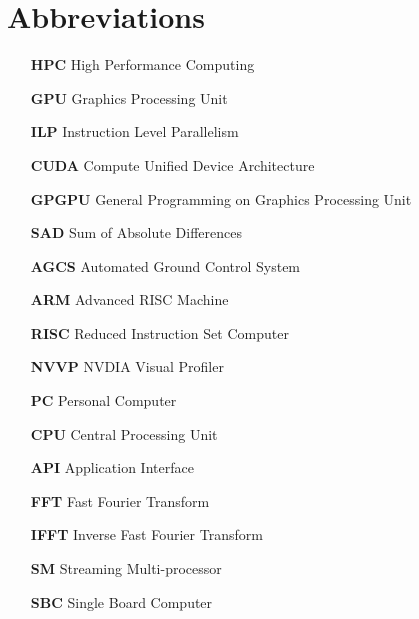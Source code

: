 \chapter*{Abbreviations}
\begin{itemize}
\item [\textbf{HPC}] \hspace{0.5cm} High Performance Computing
\item[\textbf{GPU}]	\hspace{0.5cm}	Graphics Processing Unit
\item[\textbf{ILP}]	\hspace{0.5cm}	Instruction Level Parallelism
\item[\textbf{CUDA}]\hspace{0.5cm}	Compute Unified Device Architecture
\item[\textbf{GPGPU}]\hspace{0.5cm}	General Programming on Graphics Processing Unit
\item[\textbf{SAD}]	\hspace{0.5cm}	Sum of Absolute Differences
\item[\textbf{AGCS}]\hspace{0.5cm}	Automated Ground Control System
\item[\textbf{ARM}] \hspace{0.5cm}	Advanced RISC Machine
\item[\textbf{RISC}] \hspace{0.5cm}	Reduced Instruction Set Computer
\item[\textbf{NVVP}] \hspace{0.5cm}	NVDIA Visual Profiler 
\item[\textbf{PC}]	\hspace{0.5cm}	Personal Computer
\item[\textbf{CPU}]	\hspace{0.5cm}	Central Processing Unit
\item[\textbf{API}]	\hspace{0.5cm}	Application Interface
\item[\textbf{FFT}] \hspace{0.5cm}	Fast Fourier Transform
\item[\textbf{IFFT}] \hspace{0.5cm} 	Inverse Fast Fourier Transform
\item[\textbf{SM}] 	\hspace{0.5cm}	Streaming Multi-processor
\item[\textbf{SBC}]  \hspace{0.5cm}	Single Board Computer

\end{itemize}
